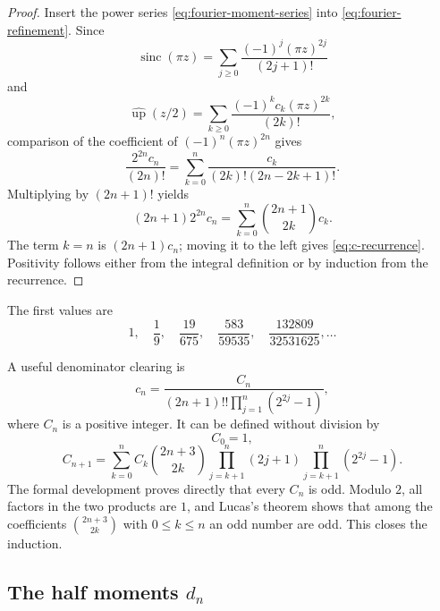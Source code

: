 \documentclass[11pt,oneside]{article}
\theoremstyle{definition}
\theoremstyle{remark}
\newcommand{\Up}{\operatorname{up}}
\newcommand{\sinc}{\operatorname{sinc}}
\begin{document}
\begin{proof}
Insert the power series \eqref{eq:fourier-moment-series} into
\eqref{eq:fourier-refinement}.  Since
\begin{equation*}
 \sinc(\pi z)=\sum_{j\ge0}\frac{(-1)^j(\pi z)^{2j}}{(2j+1)!}
\end{equation*}
and
\begin{equation*}
 \widehat{\Up}(z/2)
 =\sum_{k\ge0}\frac{(-1)^k c_k(\pi z)^{2k}}{(2k)!},
\end{equation*}
comparison of the coefficient of $(-1)^n(\pi z)^{2n}$ gives
\begin{equation*}
 \frac{2^{2n}c_n}{(2n)!}
 =\sum_{k=0}^{n}\frac{c_k}{(2k)!(2n-2k+1)!}.
\end{equation*}
Multiplying by $(2n+1)!$ yields
\begin{equation*}
 (2n+1)2^{2n}c_n
 =\sum_{k=0}^{n}\binom{2n+1}{2k}c_k.
\end{equation*}
The term $k=n$ is $(2n+1)c_n$; moving it to the left gives
\eqref{eq:c-recurrence}.  Positivity follows either from the integral definition or by
induction from the recurrence.
\end{proof}

The first values are
\begin{equation}
 1,\quad \frac19,\quad\frac{19}{675},\quad
 \frac{583}{59535},\quad\frac{132809}{32531625},\ldots     \label{eq:c-first-values}
\end{equation}

A useful denominator clearing is
\begin{equation}
 c_n=\frac{C_n}{(2n+1)!!\prod_{j=1}^{n}(2^{2j}-1)},        \label{eq:c-normalized}
\end{equation}
where $C_n$ is a positive integer.  It can be defined without division by
\begin{equation}
 C_0=1,
\end{equation}
\begin{equation}
 C_{n+1}=\sum_{k=0}^{n}C_k\binom{2n+3}{2k}
 \prod_{j=k+1}^{n}(2j+1)
 \prod_{j=k+1}^{n}(2^{2j}-1).                             \label{eq:C-division-free}
\end{equation}
The formal development proves directly that every $C_n$ is odd.  Modulo $2$, all factors in
the two products are $1$, and Lucas's theorem \cite{fine1947} shows that among the
coefficients
$\binom{2n+3}{2k}$ with $0\le k\le n$ an odd number are odd.  This closes the induction.

\subsection{The half moments $d_n$}
\end{document}
